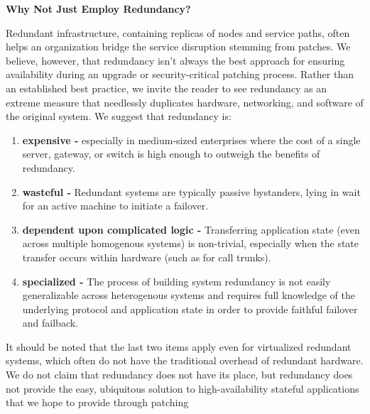{\bf Why Not Just Employ Redundancy?}
\label{ssec:redundancy}

Redundant infrastructure, containing replicas of nodes and service
paths, often helps an organization bridge the service disruption
stemming from patches.  We believe, however, that redundancy isn't
always the best approach for ensuring availability during an upgrade
or security-critical patching process.  Rather than an established
best practice, we invite the reader to see redundancy as
an extreme measure that needlessly duplicates hardware, networking, and
software of the original system. We suggest that redundancy is: 


\renewcommand{\labelenumi}{\alph{enumi}.}

\begin{enumerate}
\item {\bf expensive -} especially in medium-sized enterprises where
  the cost of a single server, gateway, or switch is high enough to
  outweigh the benefits of redundancy.

\item {\bf wasteful -} Redundant systems are typically passive
  bystanders, lying in wait for an active machine to
  initiate a failover.

\item {{\bf dependent upon complicated logic -}} Transferring application
  state (even across multiple homogenous systems) is non-trivial,
  especially when the state transfer occurs within hardware (such as
  for call trunks).

\item {{\bf specialized -}} The process of building system redundancy
  is not easily generalizable across heterogenous systems and requires
  full knowledge of the underlying protocol and application state in
  order to provide faithful failover and failback.
\end{enumerate}

It should be noted that the last two items apply even for virtualized
redundant systems, which often do not have the traditional overhead of
redundant hardware.  We do not claim that redundancy does not have its
place, but redundancy does not provide the easy, ubiquitous solution to
high-availability stateful applications that we hope to provide
through patching

